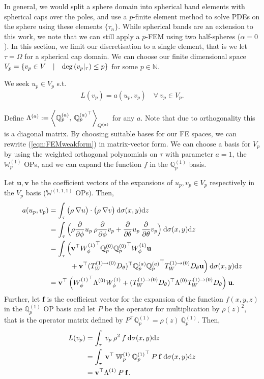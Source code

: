 \documentclass[11pt, oneside]{article}   	%
\newcommand{\N}{\mathbb{N}}
\newcommand{\element}{\tau}
\newcommand{\bigW}{\mathbb{W}}
\newcommand{\bigWiii}{{\mathbb{W}^{(1,1,1)}}}
\newcommand{\scop}{Q}
\newcommand{\scopa}{\scop^{(a)}}
\newcommand{\bigscop}{{\mathbb{Q}}}
\newcommand{\bigscopa}{\bigscop^{(a)}}
\newcommand{\ppphi}{\frac{\partial}{\partial \phi}}
\newcommand{\rhoppphi}{\rho \ppphi}
\newcommand{\pptheta}{\frac{\partial}{\partial \theta}}
\newcommand{\bigscopi}{\bigscop^{(1)}}
\newcommand{\bigscopo}{\bigscop^{(0)}}
\begin{document}
In general, we would split a sphere domain into spherical band elements with spherical caps over the poles, and use a $p$-finite element method to solve PDEs on the sphere using these elements $\{\element_n\}$. While spherical bands are an extension to this work, we note that we can still apply a $p$-FEM using two half-spheres ($\alpha = 0$). In this section, we limit our discretisation to a single element, that is we let $\element = \Omega$ for a spherical cap domain. We can choose our finite dimensional space $V_p = \{v_p \in V \quad | \quad {\rm deg}\,(v_p|_\element) \le p\}$ for some $p \in \N$.

We seek $u_p \in V_p$ s.t.
\begin{align}
	L(v_p) = a(u_p,v_p) \quad \forall \: v_p \in V_p.
	\label{eqn:FEMweakform}
\end{align}

Define $\Lambda^{(a)} :=  \ip< \bigscopa_p, \: {\bigscopa_p}^\top >_{\scopa}$ for any $a$. Note that due to orthogonality this is a diagonal matrix. By choosing suitable bases for our FE spaces, we can rewrite (\ref{eqn:FEMweakform}) in matrix-vector form. We can choose a basis for $V_p$ by using the weighted orthogonal polynomials on $\element$ with parameter $a = 1$, the $\bigW_p^{(1)}$ OPs, and we can expand the function $f$ in the $\bigscopi_p$ basis. 

Let $\mathbf{u}, \mathbf{v}$ be the coefficient vectors of the expansions of $u_p, v_p \in V_p$ respectively in the $V_p$ basis ($\bigWiii$ OPs). Then,
\begin{align*}
	a(u_p,v_p) &= \int_\element \big(\rho \: \nabla u\big) \cdot \big(\rho \: \nabla v\big) \: \D \sigma(x,y) \D z \\
	&= \int_\element \Big( \rhoppphi u_p \: \rhoppphi v_p + \pptheta u_p \: \pptheta v_p \Big) \: \D \sigma(x,y) \D z \\
	&= \int_\element \Big( \mathbf{v}^\top {W_\phi^{(1)}}^\top \bigscopo_p {\bigscopo_p}^\top W_\phi^{(1)} \mathbf{u} \nonumber \\
					& \quad \quad \quad + \mathbf{v}^\top ({T_W^{(1)\to(0)} D_\theta})^\top \bigscopa_p {\bigscopa_p}^\top T_W^{(1)\to(0)} D_\theta \mathbf{u}  \Big) \: \D \sigma(x,y) \D z \\
	&= \mathbf{v}^\top \: \Big( {W_\phi^{(1)}}^\top \Lambda^{(0)}  W_\phi^{(1)} + ({T_W^{(1)\to(0)} D_\theta})^\top \Lambda^{(0)} T_W^{(1)\to(0)} D_\theta \Big) \: \mathbf{u}.
\end{align*}
Further, let $\mathbf{f}$ is the coefficient vector for the expansion of the function $f(x,y,z)$ in the $\bigscopi_p$ OP basis and let $P$ be the operator for multiplication by $\rho(z)^2$, that is the operator matrix defined by $P^\top \bigscopi_p = \rho(z) \: \bigscopi_p$. Then,
\begin{align*}
	L(v_p) &= \int_\element \: v_p \: \rho^2 \: f \: \D \sigma(x,y) \D z \\
	&= \int_\element \: \mathbf{v}^\top \: \bigW_p^{(1)} \: {\bigscopi_p}^\top \: P \: \mathbf{f} \: \D \sigma(x,y) \D z \\	
	&= \mathbf{v}^\top \Lambda^{(1)} \: P \: \mathbf{f}.
\end{align*}
\end{document}
